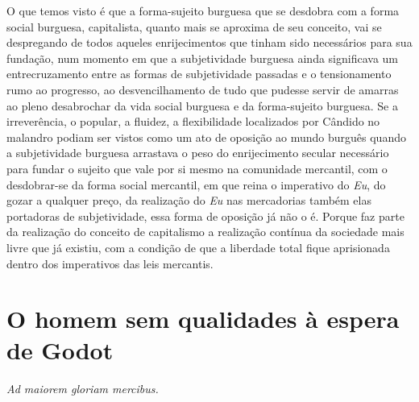 O que temos visto é que a forma-sujeito burguesa que se desdobra com a
forma social burguesa, capitalista, quanto mais se aproxima de seu
conceito, vai se despregando de todos aqueles enrijecimentos que tinham
sido necessários para sua fundação, num momento em que a subjetividade
burguesa ainda significava um entrecruzamento entre as formas de
subjetividade passadas e o tensionamento rumo ao progresso, ao
desvencilhamento de tudo que pudesse servir de amarras ao pleno
desabrochar da vida social burguesa e da forma-sujeito burguesa. Se a
irreverência, o popular, a fluidez, a flexibilidade localizados por
Cândido no malandro podiam ser vistos como um ato de oposição ao mundo
burguês quando a subjetividade burguesa arrastava o peso do
enrijecimento secular necessário para fundar o sujeito que vale por si
mesmo na comunidade mercantil, com o desdobrar-se da forma social
mercantil, em que reina o imperativo do \emph{Eu}, do gozar a qualquer
preço, da realização do \emph{Eu} nas mercadorias também elas portadoras
de subjetividade, essa forma de oposição já não o é. Porque faz parte da
realização do conceito de capitalismo a realização contínua da sociedade
mais livre que já existiu, com a condição de que a liberdade total fique
aprisionada dentro dos imperativos das leis mercantis.

\chapter{O homem sem qualidades à espera de Godot}

\emph{Ad maiorem gloriam mercibus.}

